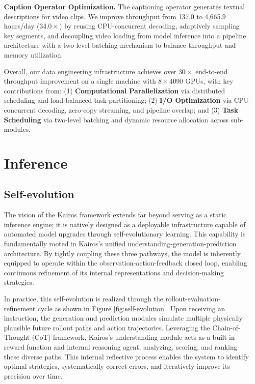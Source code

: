 \documentclass{llmxive}
\begin{document}
\textbf{Caption Operator Optimization.} The captioning operator generates textual descriptions for video clips. We improve throughput from 137.0 to 4,665.9 hours/day ($34.0\times$) by reusing CPU-concurrent decoding, adaptively sampling key segments, and decoupling video loading from model inference into a pipeline architecture with a two-level batching mechanism to balance throughput and memory utilization.


Overall, our data engineering infrastructure achieves over $30\times$ end-to-end throughput improvement on a single machine with $8\times$4090 GPUs, with key contributions from: (1) \textbf{Computational Parallelization} via distributed scheduling and load-balanced task partitioning; (2) \textbf{I/O Optimization} via CPU-concurrent decoding, zero-copy streaming, and pipeline overlap; and (3) \textbf{Task Scheduling} via two-level batching and dynamic resource allocation across sub-modules.





\section{Inference}

\subsection{Self-evolution}

The vision of the Kairos framework extends far beyond serving as a static inference engine; it is natively designed as a deployable infrastructure capable of automated model upgrades through self-evolutionary learning. This capability is fundamentally rooted in Kairos’s unified understanding-generation-prediction architecture. By tightly coupling these three pathways, the model is inherently equipped to operate within the observation-action-feedback closed loop, enabling continuous refinement of its internal representations and decision-making strategies.

In practice, this self-evolution is realized through the rollout-evaluation-refinement cycle as shown in Figure \ref{fig:self-evolution}. Upon receiving an instruction, the generation and prediction modules simulate multiple physically plausible future rollout paths and action trajectories. Leveraging the Chain-of-Thought (CoT) framework, Kairos’s understanding module acts as a built-in reward function and internal reasoning agent, analyzing, scoring, and ranking these diverse paths. This internal reflective process enables the system to identify optimal strategies, systematically correct errors, and iteratively improve its precision over time.
\end{document}
